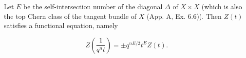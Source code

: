 Let $E$ be the self-intersection number of the diagonal $\Delta$ of $X \times X$ (which is also the top Chern class of the tangent bundle of $X$ (App. A, Ex. 6.6)). Then $Z(t)$ satisfies a functional equation, namely

$$Z\left(\frac{1}{q^n t}\right) = \pm q^{nE/2} t^E Z(t).$$
